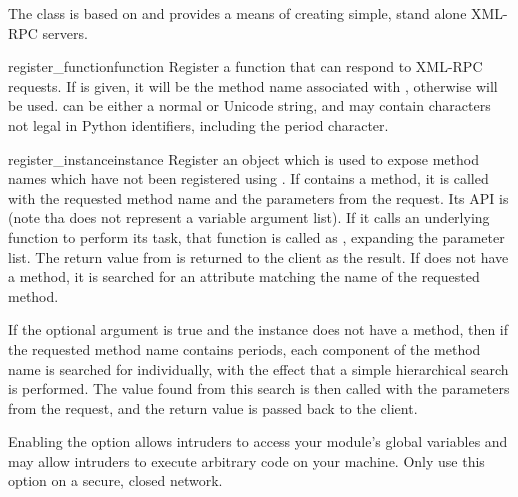 The  class is based on
 and provides a means of creating
simple, stand alone XML-RPC servers.

\begin{methoddesc}[SimpleXMLRPCServer]{register_function}{function}
  Register a function that can respond to XML-RPC requests.  If
   is given, it will be the method name associated with
  , otherwise  will be
  used.   can be either a normal or Unicode string, and may
  contain characters not legal in Python identifiers, including the
  period character.
\end{methoddesc}

\begin{methoddesc}[SimpleXMLRPCServer]{register_instance}{instance}
  Register an object which is used to expose method names which have
  not been registered using .  If
   contains a  method, it is called
  with the requested method name and the parameters from the request.  Its
  API is  (note tha
   does not represent a variable argument list).  If it calls an
  underlying function to perform its task, that function is called as
  , expanding the parameter list.
  The return value from  is returned to the client as
  the result.  If
   does not have a  method, it is
  searched for an attribute matching the name of the requested method.

  If the optional  argument is true and the
  instance does not have a  method, then
  if the requested method name contains periods, each component of the
  method name is searched for individually, with the effect that a
  simple hierarchical search is performed.  The value found from this
  search is then called with the parameters from the request, and the
  return value is passed back to the client.

  \begin{notice}[warning]
  Enabling the  option allows intruders to access
  your module's global variables and may allow intruders to execute
  arbitrary code on your machine.  Only use this option on a secure,
  closed network.
  \end{notice}


\end{methoddesc}

